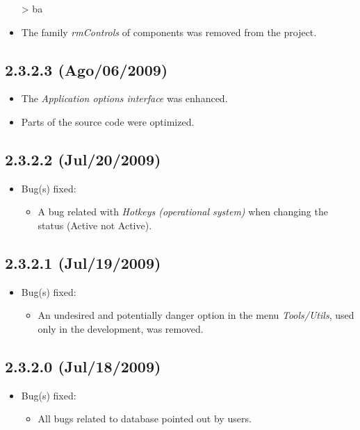 \begin{itemize}
\begin{Scode}
      > ba
    \end{Scode}

  \item The family \textit{rmControls} of components was removed from the
    project.
\end{itemize}


\subsection*{2.3.2.3 (Ago/06/2009)}
\begin{itemize}
  \item The \textit{Application options interface} was enhanced.
  \item Parts of the source code were optimized.
\end{itemize}


\subsection*{2.3.2.2 (Jul/20/2009)}
\begin{itemize}
  \item Bug(s) fixed:
    \begin{itemize}
      \item A bug related with \textit{Hotkeys (operational system)} when
        changing the status (Active not Active).
    \end{itemize}
\end{itemize}


\subsection*{2.3.2.1 (Jul/19/2009)}
\begin{itemize}
  \item Bug(s) fixed:
    \begin{itemize}
      \item An undesired and potentially danger option in the menu
        \textit{Tools/Utils}, used only in the development, was removed.
    \end{itemize}
\end{itemize}


\subsection*{2.3.2.0 (Jul/18/2009)}
\begin{itemize}
  \item Bug(s) fixed:
    \begin{itemize}
      \item All bugs related to database pointed out by users.
    \end{itemize}
\end{itemize}


